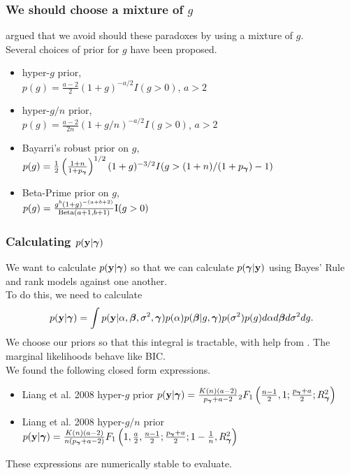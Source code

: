 \documentclass{beamer}
\begin{document}
\begin{frame}
	\frametitle{We should choose a mixture of $g$}
	\cite{Liang2008} argued that we avoid should these paradoxes by using a mixture of $g$. \\
	Several choices of prior for $g$	have been proposed.
	\small
	\begin{itemize}
		\item hyper-$g$ prior, \cite{Liang2008}\\
		$p(g) = \frac{a-2}{2} (1 + g)^{-a/2} I(g > 0)$, $a > 2$
		\item hyper-$g/n$ prior, \cite{Liang2008}\\
		$p(g) = \frac{a-2}{2n} (1 + g/n)^{-a/2} I(g > 0)$, $a > 2$ 
		\item Bayarri's robust prior on $g$, \cite{Bayarri2012} \\
		$p(g) = \frac{1}{2} \left(  \frac{1 + n}{1 + p_{\boldsymbol \gamma}} \right)^{1/2} (1 + g)^{-3/2} I(g > (1 + n)/(1 + p_{\boldsymbol \gamma}) - 1)$
		\item Beta-Prime prior on $g$, \cite{Maruyama2011} \\
		$p(g) = \frac{g^b (1 + g)^{-(a + b + 2)}}{\text{Beta}(a + 1, b + 1)} \text{I}(g > 0)$
	\end{itemize}
\end{frame}

\begin{frame}
	\frametitle{Calculating $p({\bf y} | {\boldsymbol \gamma})$}
	We want to calculate $p({\bf y} | {\boldsymbol \gamma})$ so that we can calculate $p({\boldsymbol \gamma} | {\bf y})$ using Bayes' Rule and rank models against	one another. \\
	To do this, we need to calculate
	$$p({\bf y} | {\boldsymbol \gamma}) = \int p({\bf y} | \alpha, {\boldsymbol \beta}, \sigma^2, {\boldsymbol \gamma}) p(\alpha) p({\boldsymbol \beta} | g, {\boldsymbol \gamma}) p(\sigma^2) p(g) d \alpha d {\boldsymbol \beta} d \sigma^2 d g.$$
	We choose our priors so that this integral is tractable, with help from \cite{Gradshteyn1988}.
	The marginal likelihoods behave like BIC. \\
	We found the following closed form expressions.
	\small
	\begin{itemize}
		\item Liang et al. 2008 hyper-$g$ prior \cite{Liang2008}
			$p({\bf y} | {\boldsymbol \gamma}) = \frac{K(n) (a - 2)}{p_{\boldsymbol \gamma} + a  - 2} {}_2 F_1 \left( \frac{n-1}{2}, 1; \frac{p_{\boldsymbol \gamma} + a}{2}; R_{\boldsymbol \gamma}^2 \right)$
		\item Liang et al. 2008 hyper-$g/n$ prior \cite{Liang2008}
			$p({\bf y} | {\boldsymbol \gamma}) = \frac{K(n) (a - 2)}{n (p_{\boldsymbol \gamma} + a  - 2)} F_1 \left( 1, \frac{a}{2}, \frac{n-1}{2}; \frac{p_{\boldsymbol \gamma} + a}{2}; 1 - \frac{1}{n}, R_{\boldsymbol \gamma}^2 \right)$
	\end{itemize}
	These expressions are numerically stable to evaluate.
\end{frame}
\end{document}
